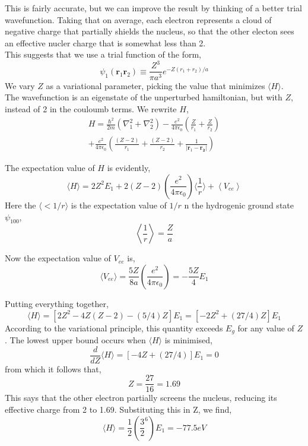 This is fairly accurate, but we can improve the result by thinking of a better trial wavefunction. Taking that on average, each electron represents a cloud of negative charge that partially shields the nucleus, so that the other electon sees an effective nucler charge that is somewhat less than 2.\\
This suggests that we use a trial function of the form,
\begin{equation}
	\psi_1(\bm{r}_1\bm{r}_2)\equiv\frac{Z^3}{\pi a^3}e^{-Z(r_1+r_2)/a}
\end{equation}
We vary $Z$ as a variational parameter, picking the value that minimizes $\langle H\rangle$.\\
The wavefunction is an eigenstate of the unperturbed hamiltonian, but with $Z$, instead of 2 in the couloumb terms. We rewrite $H$,
\begin{multline}
	H=\frac{\hbar^2}{2m}(\nabla^2_1+\nabla^2_2)-\frac{e^2}{4\pi\epsilon_0}\left(\frac{Z}{r_1}+\frac{Z}{r_2}\right)\\
	+\frac{e^2}{4\pi\epsilon_0}\left(\frac{(Z-2)}{r_1}+\frac{(Z-2)}{r_2}+\frac{1}{|\bm{r}_1-\bm{r_2}|}\right)
\end{multline}

The expectation value of $H$ is evidently,
\begin{equation}
	\langle H\rangle=2Z^2E_1+2(Z-2)\left(\frac{e^2}{4\pi\epsilon_0}\right)\langle\frac{1}{r}\rangle+\left\langle V_{ee}\right\rangle
\end{equation}
Here the $\langle<1/r\rangle$ is the expectation value of $1/r$ n the hydrogenic ground state $\psi_{100}$, 
\begin{equation}
	\left\langle \frac{1}{r}\right\rangle=\frac{Z}{a}
\end{equation}

Now the expectation value of $V_{ee}$ is,
\begin{equation}
	\langle V_{ee}\rangle =\frac{5Z}{8a}\left(\frac{e^2}{4\pi\epsilon_0}\right)=-\frac{5Z}{4}E_1
\end{equation}

Putting everything together,
\begin{equation}
	\langle H \rangle=[2Z^2-4Z(Z-2)-(5/4)Z]E_1=[-2Z^2+(27/4)Z]E_1
\end{equation}
According to the variational principle, this quantity exceeds $E_g$ for any value of $Z$. The lowest upper bound occurs when $\langle H \rangle$ is minimised,
\begin{equation}
	\frac{d}{dZ}\langle H \rangle=[-4Z+(27/4)]E_1=0
\end{equation}
from which it follows that,
\begin{equation}
	Z=\frac{27}{16}=1.69
\end{equation}
This says that the other electron partially screens the nucleus, reducing its effective charge from 2 to 1.69. Substituting this in Z, we find,
\begin{equation}
	\langle H \rangle=\frac{1}{2}\left(\frac{3}{2}^6\right)E_1=-77.5eV
\end{equation}


